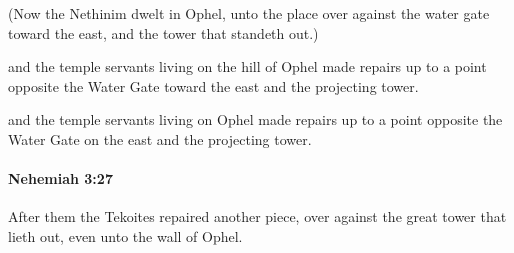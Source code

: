 			\begin{versebox}
					\item[BHS] 
					\item[LXX] 
					\item[ASV] (Now the Nethinim dwelt in Ophel, unto the place over against the water gate toward the east, and the tower that standeth out.)
					\item[NIV] and the temple servants living on the hill of Ophel made repairs up to a point opposite the Water Gate toward the east and the projecting tower.
					\item[NRSV] and the temple servants living on Ophel made repairs up to a point opposite the Water Gate on the east and the projecting tower.
			\end{versebox}

		\paragraph{Nehemiah 3:27} %
			\label{NEHEMIAH-3-27}

			After them the Tekoites repaired another piece, over against the great tower that lieth out, even unto the wall of Ophel.

